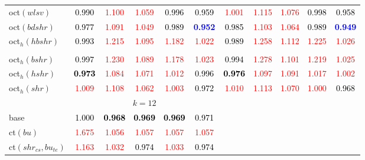 \begin{tabular}[t]{l|>{}cccc>{}c|ccccc}
oct$(wlsv)$ & \textcolor{black}{0.990} & \textcolor{red}{1.100} & \textcolor{red}{1.059} & \textcolor{black}{0.996} & \textcolor{black}{0.959} & \textcolor{red}{1.001} & \textcolor{red}{1.115} & \textcolor{red}{1.076} & \textcolor{black}{0.998} & \textcolor{black}{0.958}\\
oct$(bdshr)$ & \textcolor{black}{0.977} & \textcolor{red}{1.091} & \textcolor{red}{1.049} & \textcolor{black}{0.989} & \textcolor{blue}{\textbf{0.952}} & \textcolor{black}{0.985} & \textcolor{red}{1.103} & \textcolor{red}{1.064} & \textcolor{black}{0.989} & \textcolor{blue}{\textbf{0.949}}\\
oct$_h(hbshr)$ & \textcolor{black}{0.993} & \textcolor{red}{1.215} & \textcolor{red}{1.095} & \textcolor{red}{1.182} & \textcolor{red}{1.022} & \textcolor{black}{0.989} & \textcolor{red}{1.258} & \textcolor{red}{1.112} & \textcolor{red}{1.225} & \textcolor{red}{1.026}\\[-1.5ex]
\hline\\[-1.5ex]
oct$_h(bshr)$ & \textcolor{black}{0.997} & \textcolor{red}{1.230} & \textcolor{red}{1.089} & \textcolor{red}{1.178} & \textcolor{red}{1.023} & \textcolor{black}{0.994} & \textcolor{red}{1.278} & \textcolor{red}{1.101} & \textcolor{red}{1.219} & \textcolor{red}{1.025}\\
oct$_h(hshr)$ & \textcolor{black}{\textbf{0.973}} & \textcolor{red}{1.084} & \textcolor{red}{1.071} & \textcolor{red}{1.012} & \textcolor{black}{0.996} & \textcolor{black}{\textbf{0.976}} & \textcolor{red}{1.097} & \textcolor{red}{1.091} & \textcolor{red}{1.017} & \textcolor{red}{1.002}\\
oct$_h(shr)$ & \textcolor{red}{1.009} & \textcolor{red}{1.108} & \textcolor{red}{1.062} & \textcolor{red}{1.003} & \textcolor{black}{0.972} & \textcolor{red}{1.010} & \textcolor{red}{1.113} & \textcolor{red}{1.070} & \textcolor{red}{1.000} & \textcolor{black}{0.968}\\
\addlinespace[0.3em]
\multicolumn{1}{c}{} & \multicolumn{5}{c}{\textbf{$k = 12$}} & \multicolumn{5}{c}{}\\
base & \textcolor{black}{1.000} & \textcolor{black}{\textbf{0.968}} & \textcolor{black}{\textbf{0.969}} & \textcolor{black}{\textbf{0.969}} & \textcolor{black}{0.971} &  &  &  &  & \\
ct$(bu)$ & \textcolor{red}{1.675} & \textcolor{red}{1.056} & \textcolor{red}{1.057} & \textcolor{red}{1.057} & \textcolor{red}{1.057} &  &  &  &  & \\
ct$(shr_{cs}, bu_{te})$ & \textcolor{red}{1.163} & \textcolor{red}{1.032} & \textcolor{black}{0.974} & \textcolor{red}{1.033} & \textcolor{black}{0.974} &  &  &  &  & \\

\end{tabular}
